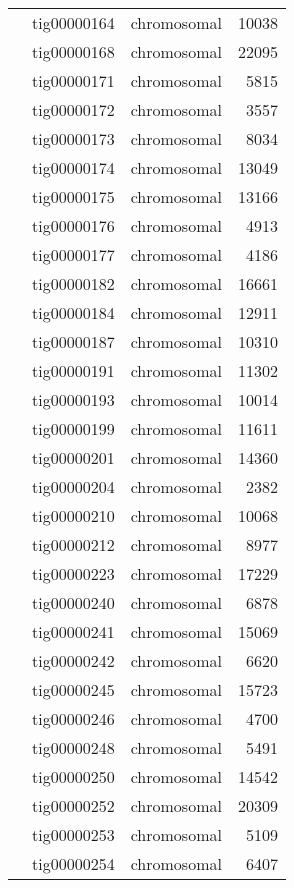 {\begin{supertabular}{llcr}
         & tig00000164 & chromosomal & 10038 \\
         & tig00000168 & chromosomal & 22095 \\
         & tig00000171 & chromosomal & 5815 \\
         & tig00000172 & chromosomal & 3557 \\
         & tig00000173 & chromosomal & 8034 \\
         & tig00000174 & chromosomal & 13049 \\
         & tig00000175 & chromosomal & 13166 \\
         & tig00000176 & chromosomal & 4913 \\
         & tig00000177 & chromosomal & 4186 \\
         & tig00000182 & chromosomal & 16661 \\
         & tig00000184 & chromosomal & 12911 \\
         & tig00000187 & chromosomal & 10310 \\
         & tig00000191 & chromosomal & 11302 \\
         & tig00000193 & chromosomal & 10014 \\
         & tig00000199 & chromosomal & 11611 \\
         & tig00000201 & chromosomal & 14360 \\
         & tig00000204 & chromosomal & 2382 \\
         & tig00000210 & chromosomal & 10068 \\
         & tig00000212 & chromosomal & 8977 \\
         & tig00000223 & chromosomal & 17229 \\
         & tig00000240 & chromosomal & 6878 \\
         & tig00000241 & chromosomal & 15069 \\
         & tig00000242 & chromosomal & 6620 \\
         & tig00000245 & chromosomal & 15723 \\
         & tig00000246 & chromosomal & 4700 \\
         & tig00000248 & chromosomal & 5491 \\
         & tig00000250 & chromosomal & 14542 \\
         & tig00000252 & chromosomal & 20309 \\
         & tig00000253 & chromosomal & 5109 \\
         & tig00000254 & chromosomal & 6407 \\

\end{supertabular}}
